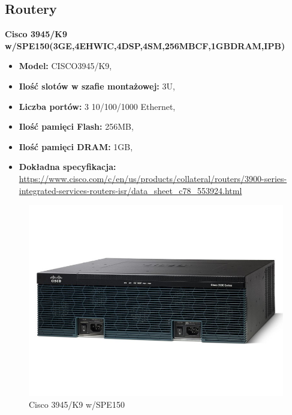 \documentclass[12pt,a4paper,titlepage]{article}
\begin{document}
\subsection{Routery}
\textbf{Cisco 3945/K9 w/SPE150(3GE,4EHWIC,4DSP,4SM,256MBCF,1GBDRAM,IPB)}
\begin{itemize}
    \item \textbf{Model:} CISCO3945/K9,
    \item \textbf{Ilość slotów w szafie montażowej:} 3U,
    \item \textbf{Liczba portów:} 3 10/100/1000 Ethernet,
    \item \textbf{Ilość pamięci Flash:} 256MB,
    \item \textbf{Ilość pamięci DRAM:} 1GB,
    \item \textbf{Dokładna specyfikacja:}  \url{https://www.cisco.com/c/en/us/products/collateral/routers/3900-series-integrated-services-routers-isr/data_sheet_c78_553924.html}
\end{itemize}
\begin{figure}[H]
  \centering
    \includegraphics[width=14cm]{images/router.jpg}
    \caption{Cisco 3945/K9 w/SPE150}
    \label{fig:router}
\end{figure}

\newpage
\end{document}
